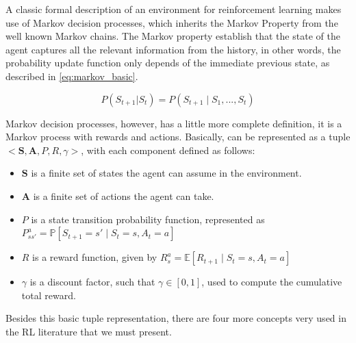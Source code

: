 A classic formal description of an environment for reinforcement learning makes use of Markov decision processes, which inherits the Markov Property from the well known Markov chains. The Markov property establish that the state of the agent captures all the relevant information from the history, in other words, the probability update function only depends of the immediate previous state, as described in \ref{eq:markov_basic}.

\begin{equation}
P(S_{t+1} | S_t) = P(S_{t+1} \mid S_1, ..., S_t)
\label{eq:markov_basic}
\end{equation}

Markov decision processes, however, has a little more complete definition, it is a Markov process with rewards and actions. Basically, can be represented as a tuple $<\textbf{S}, \textbf{A}, P, R, \gamma>$, with each component defined as follows:
\begin{itemize}
\item
	$\textbf{S}$ is a finite set of states the agent can assume in the environment.
\item
	$\textbf{A}$ is a finite set of actions the agent can take.
\item
	$P$ is a state transition probability function, represented as $P_{ss'}^a = \mathbb{P}[S_{t+1}=s' \mid S_t = s, A_t = a]$
\item
	$R$ is a reward function, given by $R_s^a = \mathbb{E}[R_{t+1} \mid S_t = s, A_t = a]$
\item
	$\gamma$ is a discount factor, such that $\gamma \in [0,1]$, used to compute the cumulative total reward.
	
\end{itemize}

Besides this basic tuple representation, there are four more concepts very used in the RL literature that we must present.

